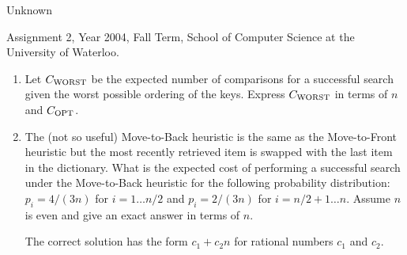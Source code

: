\begin{authorship}Unknown\end{authorship}
\begin{usage}
Assignment 2, Year 2004, Fall Term, School of Computer Science at the University of Waterloo.
\end{usage}
 
\begin{enumerate}

\item Let $C_{\mbox{\scriptsize WORST}}$ be the expected number of
comparisons for a successful search given the worst possible ordering
of the keys.
%
Express $C_{\mbox{\scriptsize
WORST}}$ in terms of $n$ and $C_{\mbox{\scriptsize OPT}}$.

\item The (not so useful) Move-to-Back heuristic is the same as the
Move-to-Front heuristic but the most recently retrieved item is
swapped with the last item in the dictionary.
%
What is the expected cost of performing a successful search under the
Move-to-Back heuristic for the following probability distribution:
$p_i = 4/(3n)$ for $i=1\ldots n/2$ and $p_i = 2/(3n)$ for
$i=n/2+1\ldots n$.  
%
Assume $n$ is even and give an exact answer in terms of $n$.  
%
\begin{hint}
The correct solution has the form $c_1+c_2n$ for rational numbers
$c_1$ and $c_2$.
\end{hint}

\end{enumerate}

